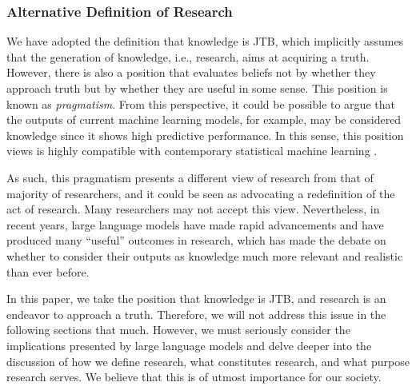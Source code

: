 \documentclass{book}
\begin{document}


\subsubsection{Alternative Definition of Research}
We have adopted the definition that knowledge is JTB, which implicitly assumes that the generation of knowledge, i.e., research, aims at acquiring a truth. However, there is also a position that evaluates beliefs not by whether they approach truth but by whether they are useful in some sense. This position is known as \textit{pragmatism}. From this perspective, it could be possible to argue that the outputs of current machine learning models, for example, may be considered knowledge since it shows high predictive performance. In this sense, this position views is highly compatible with contemporary statistical machine learning \cite{otsuka2022thinking}.

As such, this pragmatism presents a different view of research from that of majority of researchers, and it could be seen as advocating a redefinition of the act of research. Many researchers may not accept this view. Nevertheless, in recent years, large language models have made rapid advancements and have produced many ``useful'' outcomes in research, which has made the debate on whether to consider their outputs as knowledge much more relevant and realistic than ever before.

In this paper, we take the position that knowledge is JTB, and research is an endeavor to approach a truth. Therefore, we will not address this issue in the following sections that much. However, we must seriously consider the implications presented by large language models and delve deeper into the discussion of how we define research, what constitutes research, and what purpose research serves. We believe that this is of utmost importance for our society.
\end{document}

